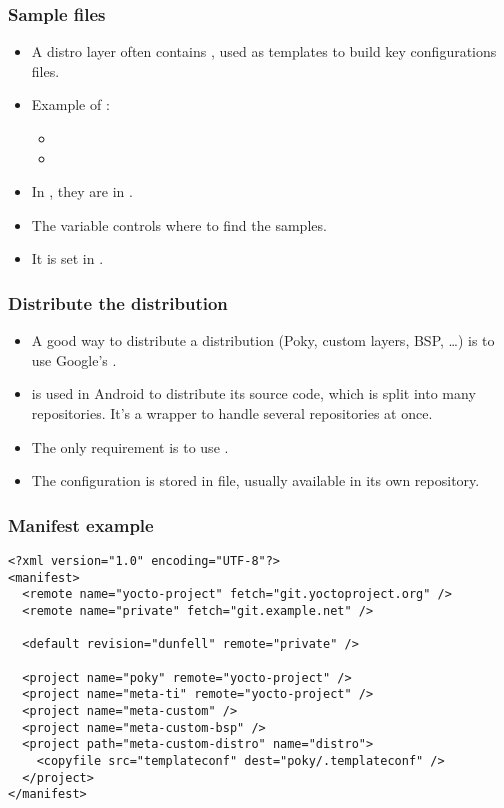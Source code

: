 \begin{frame}
  \frametitle{Sample files}
  \begin{itemize}
    \item A distro layer often contains , used as
      templates to build key configurations files.
    \item Example of :
      \begin{itemize}
        \item {}
        \item {}
      \end{itemize}
    \item In , they are in .
    \item The  variable controls where to find the
      samples.
    \item It is set in .
  \end{itemize}
\end{frame}

\begin{frame}
  \frametitle{Distribute the distribution}
  \begin{itemize}
    \item A good way to distribute a distribution (Poky, custom
      layers, BSP, \dots) is to use Google's
      .
    \item {} is used in Android to distribute its source
      code, which is split into many  repositories. It's a
      wrapper to handle several  repositories at once.
    \item The only requirement is to use .
    \item The  configuration is stored in 
      file, usually available in its own  repository.
  \end{itemize}
\end{frame}

\begin{frame}[fragile]
  \frametitle{Manifest example}
  \begin{block}{}
  \fontsize{9}{9}\selectfont
  \begin{verbatim}
<?xml version="1.0" encoding="UTF-8"?>
<manifest>
  <remote name="yocto-project" fetch="git.yoctoproject.org" />
  <remote name="private" fetch="git.example.net" />

  <default revision="dunfell" remote="private" />

  <project name="poky" remote="yocto-project" />
  <project name="meta-ti" remote="yocto-project" />
  <project name="meta-custom" />
  <project name="meta-custom-bsp" />
  <project path="meta-custom-distro" name="distro">
    <copyfile src="templateconf" dest="poky/.templateconf" />
  </project>
</manifest>
  \end{verbatim}
  \end{block}
\end{frame}

